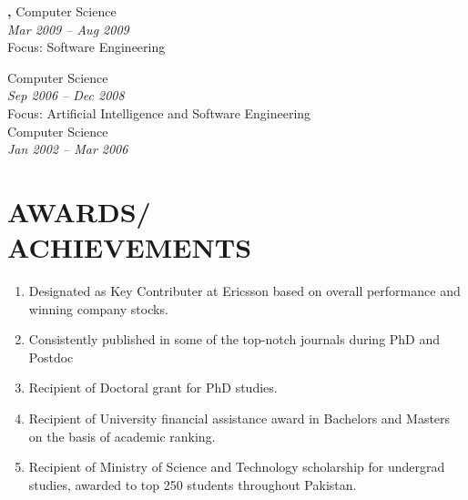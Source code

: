 \documentclass[margin, 10pt]{res} %
\begin{document}
\begin{resume}
{\bf \color{Black}{Exchange Student},} Computer Science \\
{\color{RubineRed}{University of Limerick, Ireland}} \hfill \textit{Mar 2009 -- Aug 2009} \\
Focus: Software Engineering 

{\bf \color{Black}{Master of Science,}} Computer Science \\ %
{\color{RubineRed}{Lahore University of Management Sciences, Pakistan}} \hfill \textit{Sep 2006 -- Dec 2008} \\
Focus: Artificial Intelligence and Software Engineering \\

{\bf \color{Black}{Bachelor of Science,}} Computer Science \\ %
{\color{RubineRed}{University of Peshawar, Pakistan}} \hfill \textit{Jan 2002 -- Mar 2006} \\


\section{AWARDS/ \\ ACHIEVEMENTS} 

\begin{enumerate}
\item Designated as Key Contributer at Ericsson based on overall performance and winning company stocks.
\item Consistently published in some of the top-notch journals during PhD and Postdoc
\item Recipient of Doctoral grant for PhD studies.
\item Recipient of University financial assistance award in Bachelors and Masters on the basis of academic ranking.
\item Recipient of Ministry of Science and Technology scholarship for undergrad studies, awarded to top 250 students throughout Pakistan.
\end{enumerate} 


\end{resume}
\end{document}

